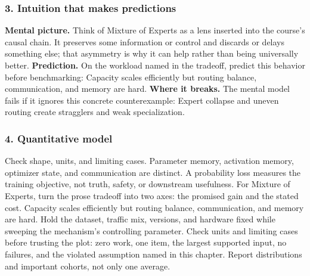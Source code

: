 \subsubsection*{3. Intuition that makes predictions}
\textbf{Mental picture.} Think of Mixture of Experts as a lens inserted into the course's causal chain. It preserves some information or control and discards or delays something else; that asymmetry is why it can help rather than being universally better.
\textbf{Prediction.} On the workload named in the tradeoff, predict this behavior before benchmarking: Capacity scales efficiently but routing balance, communication, and memory are hard.
\textbf{Where it breaks.} The mental model fails if it ignores this concrete counterexample: Expert collapse and uneven routing create stragglers and weak specialization.
\subsubsection*{4. Quantitative model}
Check shape, units, and limiting cases. Parameter memory, activation memory, optimizer state, and communication are distinct. A probability loss measures the training objective, not truth, safety, or downstream usefulness.
For Mixture of Experts, turn the prose tradeoff into two axes: the promised gain and the stated cost. Capacity scales efficiently but routing balance, communication, and memory are hard. Hold the dataset, traffic mix, versions, and hardware fixed while sweeping the mechanism's controlling parameter.
Check units and limiting cases before trusting the plot: zero work, one item, the largest supported input, no failures, and the violated assumption named in this chapter. Report distributions and important cohorts, not only one average.
